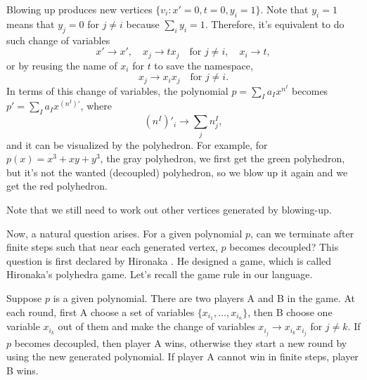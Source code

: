\documentclass[12pt]{article}
\theoremstyle{definition}
\theoremstyle{plain}
\begin{document}
Blowing up produces new vertices 
$
	\{v_i:x'=0,t=0,y_i=1\}
$.
Note that $y_i=1$ means that $y_j=0$ for $j\neq i$ because $\sum_i y_i=1$. Therefore, it's equivalent to 
do such change of variables
\[
	x'\to x',\quad x_j\to tx_j\quad \text{for $j\neq i$},\quad x_i\to t,
\]
or by reusing the name of $x_i$ for $t$ to save the namespace,
\[
	x_j\to x_ix_j\quad \text{for $j\neq i$}.
\]
In terms of this change of variables, the polynomial $p=\sum_I a_I x^{n^I}$ becomes 
$p'=\sum_I a_I x^{(n^I)'}$, where
\[
	(n^I)'_i\longrightarrow \sum_j n^I_j,
\]
and it can be visualized by the polyhedron.
For example, for $p(x)=x^3+xy+y^3$, the gray polyhedron, we first get the green polyhedron, 
but it's not the wanted (decoupled) polyhedron, so we blow up it again and we get the red polyhedron.
\begin{center}
\end{center}
Note that we still need to work out other vertices generated by blowing-up. 

Now, a natural question arises. For a given polynomial $p$, 
can we terminate after finite steps such that near each generated vertex, $p$ becomes 
decoupled? This question is first declared by Hironaka \cite{hironaka1967}. He designed a game, which is 
called Hironaka's polyhedra game. Let's recall the game rule in our language.

Suppose $p$ is a given polynomial. There are two players A and B in the game. 
At each round, first A choose a set of variables $\{x_{i_1},\dots,x_{i_n}\}$, then
B choose one variable $x_{i_k}$ out of them and make the change of variables 
$x_{i_j} \to x_{i_k}x_{i_j}$ for $j\neq k$.
If $p$ becomes decoupled, then player A wins, otherwise they start a new round by using the 
new generated polynomial. If player A cannot win in finite steps, player B wins.
\end{document}
